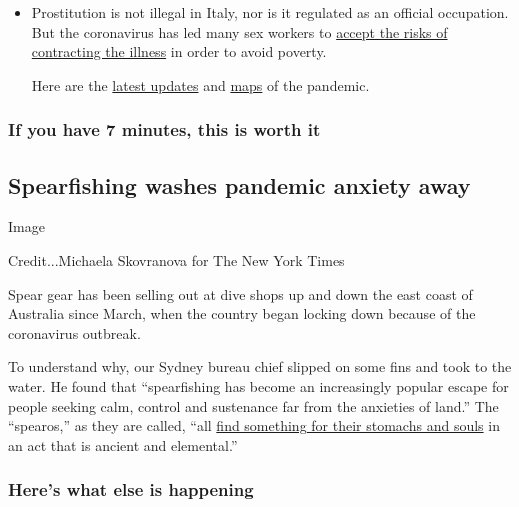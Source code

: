 \begin{itemize}
\item
  Prostitution is not illegal in Italy, nor is it regulated as an
  official occupation. But the coronavirus has led many sex workers to
  \href{https://www.nytimes.com/2020/08/03/world/europe/italy-coronavirus-prostitution-sex-work.html}{accept
  the risks of contracting the illness} in order to avoid poverty.

  Here are the
  \href{https://www.nytimes.com/2020/08/03/world/coronavirus-covid-19.html?action=click\&pgtype=Article\&state=default\&module=styln-coronavirus\&region=TOP_BANNER\&context=storylines_menu}{latest
  updates} and
  \href{https://www.nytimes.com/interactive/2020/world/coronavirus-maps.html}{maps}
  of the pandemic.
\end{itemize}

\hypertarget{if-you-have-7-minutes-this-is-worth-it}{%
\subsubsection{If you have 7 minutes, this is worth
it}\label{if-you-have-7-minutes-this-is-worth-it}}

\hypertarget{spearfishing-washes-pandemic-anxiety-away}{%
\subsection{Spearfishing washes pandemic anxiety
away}\label{spearfishing-washes-pandemic-anxiety-away}}

Image

Credit...Michaela Skovranova for The New York Times

Spear gear has been selling out at dive shops up and down the east coast
of Australia since March, when the country began locking down because of
the coronavirus outbreak.

To understand why, our Sydney bureau chief slipped on some fins and took
to the water. He found that ``spearfishing has become an increasingly
popular escape for people seeking calm, control and sustenance far from
the anxieties of land.'' The ``spearos,'' as they are called, ``all
\href{https://www.nytimes.com/2020/08/03/world/australia/spearfishing-sydney-coronavirus.html}{find
something for their stomachs and souls} in an act that is ancient and
elemental.''

\hypertarget{heres-what-else-is-happening}{%
\subsubsection{Here's what else is
happening}\label{heres-what-else-is-happening}}

